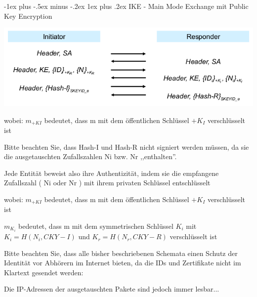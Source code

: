 \documentclass[a4paper]{article}
\makeatletter
\renewcommand{\subsubsection}{\@startsection{subsubsection}{3}{0mm}%
 {-1ex plus -.5ex minus -.2ex}%
 {1ex plus .2ex}%
 {\normalfont\small\bfseries}}
\makeatother
\begin{document}
\begin{multicols}{3}
\begin{itemize*}
            \subsubsection{IKE - Main Mode Exchange mit Public Key Encryption}
            \begin{itemize*}
                  \item \includegraphics[width=\linewidth]{Assets/NetworkSecurity-IKE-exchange-public-key.png}
                  \begin{itemize*}
                        \item wobei: ${m}_{+KI}$ bedeutet, dass m mit dem öffentlichen Schlüssel $+K_I$ verschlüsselt ist
                        \item Bitte beachten Sie, dass Hash-I und Hash-R nicht signiert werden müssen, da sie die ausgetauschten Zufallszahlen Ni bzw. Nr ,,enthalten''.
                        \begin{itemize*} \item Jede Entität beweist also ihre Authentizität, indem sie die empfangene Zufallszahl ( Ni oder Nr ) mit ihrem privaten Schlüssel entschlüsselt \end{itemize*}
                  \end{itemize*}
                  \begin{itemize*}
                        \item wobei: ${m}_{+KI}$ bedeutet, dass m mit dem öffentlichen Schlüssel $+K_I$ verschlüsselt ist
                        \item ${m}_{K_i}$ bedeutet, dass m mit dem symmetrischen Schlüssel $K_i$ mit $K_i=H(N_i, CKY-I)$ und $K_r=H(N_r,CKY-R)$ verschlüsselt ist
                        \item Bitte beachten Sie, dass alle bisher beschriebenen Schemata einen Schutz der Identität vor Abhörern im Internet bieten, da die IDs und Zertifikate nicht im Klartext gesendet werden:
                        \item Die IP-Adressen der ausgetauschten Pakete sind jedoch immer lesbar...
                  \end{itemize*}
            \end{itemize*}


\end{itemize*}
\end{multicols}
\end{document}
